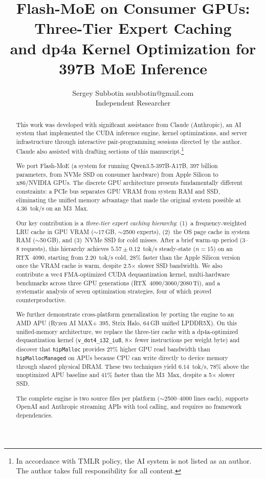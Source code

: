 \documentclass[10pt]{article}
\title{Flash-MoE on Consumer GPUs: Three-Tier Expert Caching\\and dp4a Kernel Optimization for 397B MoE Inference}
\author{\name Sergey Subbotin \email ssubbotin@gmail.com \\
      \addr Independent Researcher}
\begin{document}
\maketitle

\begin{abstract}
This work was developed with significant assistance from Claude (Anthropic), an AI system that implemented the CUDA inference engine, kernel optimizations, and server infrastructure through interactive pair-programming sessions directed by the author. Claude also assisted with drafting sections of this manuscript.\footnote{In accordance with TMLR policy, the AI system is not listed as an author. The author takes full responsibility for all content.}

We port Flash-MoE (a system for running Qwen3.5-397B-A17B, 397 billion parameters, from NVMe SSD on consumer hardware) from Apple Silicon to x86/NVIDIA GPUs. The discrete GPU architecture presents fundamentally different constraints: a PCIe bus separates GPU VRAM from system RAM and SSD, eliminating the unified memory advantage that made the original system possible at 4.36~tok/s on an M3~Max.

Our key contribution is a \emph{three-tier expert caching hierarchy}: (1)~a frequency-weighted LRU cache in GPU VRAM ($\sim$17\,GB, $\sim$2500 experts), (2)~the OS page cache in system RAM ($\sim$50\,GB), and (3)~NVMe SSD for cold misses. After a brief warm-up period (3--8 requests), this hierarchy achieves $5.57 \pm 0.12$~tok/s steady-state ($n=15$) on an RTX~4090, starting from 2.20~tok/s cold, 28\% faster than the Apple Silicon version once the VRAM cache is warm, despite 2.5$\times$ slower SSD bandwidth. We also contribute a vec4 FMA-optimized CUDA dequantization kernel, multi-hardware benchmarks across three GPU generations (RTX~4090/3060/2080\,Ti), and a systematic analysis of seven optimization strategies, four of which proved counterproductive.

We further demonstrate cross-platform generalization by porting the engine to an AMD APU (Ryzen AI MAX+ 395, Strix Halo, 64\,GB unified LPDDR5X). On this unified-memory architecture, we replace the three-tier cache with a dp4a-optimized dequantization kernel (\texttt{v\_dot4\_i32\_iu8}, 8$\times$ fewer instructions per weight byte) and discover that \texttt{hipMalloc} provides 27\% higher GPU read bandwidth than \texttt{hipMallocManaged} on APUs because CPU can write directly to device memory through shared physical DRAM. These two techniques yield $6.14$~tok/s, 78\% above the unoptimized APU baseline and 41\% faster than the M3~Max, despite a 5$\times$ slower SSD.

The complete engine is two source files per platform ($\sim$2500--4000 lines each), supports OpenAI and Anthropic streaming APIs with tool calling, and requires no framework dependencies.
\end{abstract}
\end{document}
